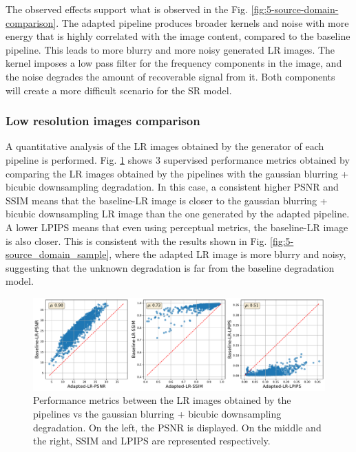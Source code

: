        

        The observed effects support what is observed in the Fig. \ref{fig:5-source-domain-comparison}. 
        The adapted pipeline produces broader kernels and noise with more energy that is highly correlated with the image content, compared to the baseline pipeline.
        This leads to more blurry and more noisy generated LR images. 
        The kernel imposes a low pass filter for the frequency components in the image, and the noise degrades the amount of recoverable signal from it.
        Both components will create a more difficult scenario for the SR model. 

        \subsubsection{Low resolution images comparison} \label{subsec:results-lr-comparison}

        A quantitative analysis of the LR images obtained by the generator of each pipeline is performed. 
        Fig. \ref{fig:5-source-domain-lr-performance-scatterplot} shows 3 supervised performance metrics obtained by comparing the LR images obtained by the pipelines with the gaussian blurring + bicubic downsampling degradation.
        In this case, a consistent higher PSNR and SSIM means that the baseline-LR image is closer to the gaussian blurring + bicubic downsampling LR image than the one generated by the adapted pipeline. 
        A lower LPIPS means that even using perceptual metrics, the baseline-LR image is also closer.
        This is consistent with the results shown in Fig. \ref{fig:5-source_domain_sample}, where the adapted LR image is more blurry and noisy, suggesting that the unknown degradation is far from the baseline degradation model.
        
        \begin{figure}[H]
            \centering
            \includegraphics[width=\textwidth]{Includes/5-source-domain-lr-performance-scatterplot.pdf}
            \caption{Performance metrics between the LR images obtained by the pipelines vs the gaussian blurring + bicubic downsampling degradation.
                     On the left, the PSNR is displayed. On the middle and the right, SSIM and LPIPS are represented respectively.}
            \label{fig:5-source-domain-lr-performance-scatterplot}
        \end{figure}




